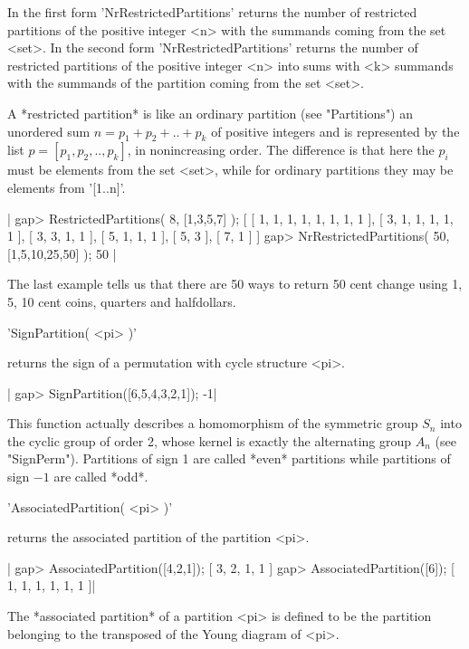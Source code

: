 In  the first  form    'NrRestrictedPartitions'  returns the  number   of
restricted partitions of  the   positive integer <n>  with  the  summands
coming from the  set <set>.  In  the second form 'NrRestrictedPartitions'
returns the number of restricted  partitions of the positive integer  <n>
into sums  with <k> summands  with the  summands  of the partition coming
from the set <set>.

A *restricted partition* is like an ordinary partition (see "Partitions")
an  unordered  sum $n =  p_1+p_2 +..+  p_k$ of  positive  integers and is
represented by the list  $p =  [p_1,p_2,..,p_k]$, in nonincreasing order.
The difference is that  here  the $p_i$ must   be elements from the   set
<set>, while for ordinary partitions they may be elements from '[1..n]'.

|    gap> RestrictedPartitions( 8, [1,3,5,7] );
    [ [ 1, 1, 1, 1, 1, 1, 1, 1 ], [ 3, 1, 1, 1, 1, 1 ], [ 3, 3, 1, 1 ],
      [ 5, 1, 1, 1 ], [ 5, 3 ], [ 7, 1 ] ]
    gap> NrRestrictedPartitions( 50, [1,5,10,25,50] );
    50 |

The last example tells us that there are 50 ways to return 50 cent change
using 1, 5, 10 cent coins, quarters and halfdollars.


'SignPartition( <pi> )'

returns the sign of a permutation with cycle structure <pi>.

|    gap> SignPartition([6,5,4,3,2,1]);
    -1|

This function actually describes  a homomorphism of  the  symmetric group
$S_n$ into  the  cyclic group of order  2,  whose  kernel  is exactly the
alternating  group $A_n$  (see "SignPerm").  Partitions  of  sign  1  are
called *even* partitions while partitions of sign $-1$ are called *odd*.


'AssociatedPartition( <pi> )'

returns the associated partition of the partition <pi>.

|    gap> AssociatedPartition([4,2,1]);
    [ 3, 2, 1, 1 ]
    gap> AssociatedPartition([6]);
    [ 1, 1, 1, 1, 1, 1 ]|

The  *associated  partition*  of a  partition  <pi> is  defined to be the
partition belonging to the transposed of the Young diagram of <pi>.


